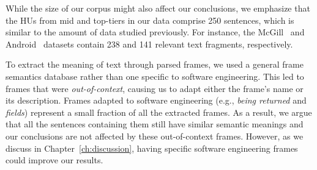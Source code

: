 While the size of our corpus might also affect our conclusions,
we emphasize that the HUs from mid and top-tiers in our data comprise 250 sentences, 
which is similar to the amount of data studied previously. For instance, the McGill~\cite{Petrosyan2015}
and Android~\cite{Jiang2016b} datasets contain 238 and 141 relevant text fragments, respectively.


To extract the meaning of text through parsed frames, 
we used a general frame semantics database rather than one
specific to software engineering.  This led to frames that were
\textit{out-of-context}, causing us to adapt either the frame's
name or its description.  
Frames adapted to software engineering (e.g., \textit{being returned}
and \textit{fields}) represent a small fraction of all the extracted
frames. As a result, we argue that all the sentences containing them still have
similar semantic meanings and our conclusions are not
affected by these out-of-context frames. However, as we discuss in Chapter~\ref{ch:discussion}, 
having specific
software engineering frames could improve our results.
